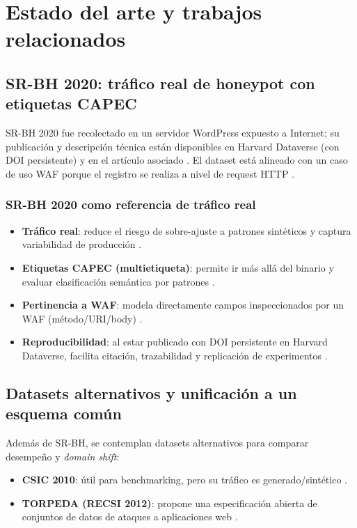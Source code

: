 \documentclass[12pt,oneside]{report}
\begin{document}
\chapter{Estado del arte y trabajos relacionados}

\section{SR-BH 2020: tráfico real de honeypot con etiquetas CAPEC}
SR-BH 2020 fue recolectado en un servidor WordPress expuesto a Internet; su publicación y descripción técnica están disponibles
en Harvard Dataverse (con DOI persistente) y en el artículo asociado \cite{srbh_dataverse,srbh_paper}. El dataset está alineado con un caso de uso WAF
porque el registro se realiza a nivel de request HTTP \cite{owasp_waf,modsecurity_site}.

\subsection{SR-BH 2020 como referencia de tráfico real}
\begin{itemize}[leftmargin=*]
  \item \textbf{Tráfico real}: reduce el riesgo de sobre-ajuste a patrones sintéticos y captura variabilidad de producción \cite{srbh_paper}.
  \item \textbf{Etiquetas CAPEC (multietiqueta)}: permite ir más allá del binario y evaluar clasificación semántica por patrones \cite{srbh_paper,capec_about}.
  \item \textbf{Pertinencia a WAF}: modela directamente campos inspeccionados por un WAF (método/URI/body) \cite{owasp_waf,modsecurity_site}.
  \item \textbf{Reproducibilidad}: al estar publicado con DOI persistente en Harvard Dataverse, facilita citación, trazabilidad y replicación de experimentos \cite{srbh_dataverse}.
\end{itemize}

\section{Datasets alternativos y unificación a un esquema común}
Además de SR-BH, se contemplan datasets alternativos para comparar desempeño y \textit{domain shift}:
\begin{itemize}[leftmargin=*]
  \item \textbf{CSIC 2010}: útil para benchmarking, pero su tráfico es generado/sintético \cite{csic2010_impact}.
  \item \textbf{TORPEDA (RECSI 2012)}: propone una especificación abierta de conjuntos de datos de ataques a aplicaciones web \cite{torpeda_2012}.
\end{itemize}
\end{document}
